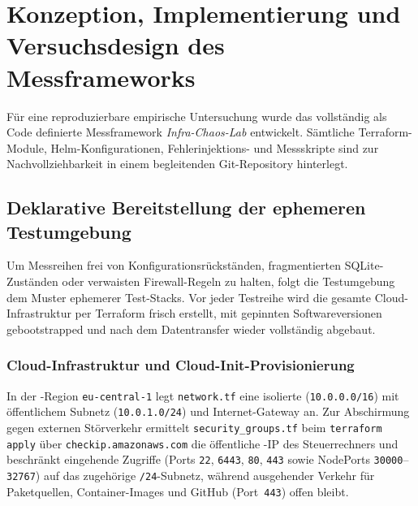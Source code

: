 \chapter{Konzeption, Implementierung und Versuchsdesign des Messframeworks}
\label{chap:konzeption-implementierung}

Für eine reproduzierbare empirische Untersuchung wurde das vollständig als Code definierte Messframework \textit{Infra-Chaos-Lab} entwickelt. Sämtliche Terraform-Module, Helm-Konfigurationen, Fehlerinjektions- und Messskripte sind zur Nachvollziehbarkeit in einem begleitenden Git-Repository hinterlegt.\autocite{messframework_repo_2026}

\section{Deklarative Bereitstellung der ephemeren Testumgebung}
\label{sec:architektur-bereitstellung-testumgebung}

Um Messreihen frei von Konfigurationsrückständen, fragmentierten SQLite-Zuständen oder verwaisten Firewall-Regeln zu halten, folgt die Testumgebung dem Muster ephemerer Test-Stacks.\autocite[Kap.~9]{morris_iac_2020} Vor jeder Testreihe wird die gesamte Cloud-Infrastruktur per Terraform frisch erstellt, mit gepinnten Softwareversionen gebootstrapped und nach dem Datentransfer wieder vollständig abgebaut.

\subsection{Cloud-Infrastruktur und Cloud-Init-Provisionierung}
\label{subsec:cloud-infrastruktur-cloud-init}

In der -Region \texttt{eu-central-1} legt \texttt{network.tf} eine isolierte  (\texttt{10.0.0.0/16}) mit öffentlichem Subnetz (\texttt{10.0.1.0/24}) und Internet-Gateway an. Zur Abschirmung gegen externen Störverkehr ermittelt \texttt{security\_groups.tf} beim \texttt{terraform apply} über \texttt{checkip.amazonaws.com} die öffentliche -IP des Steuerrechners und beschränkt eingehende Zugriffe (Ports \texttt{22}, \texttt{6443}, \texttt{80}, \texttt{443} sowie NodePorts \texttt{30000}--\texttt{32767}) auf das zugehörige \texttt{/24}-Subnetz, während ausgehender Verkehr für Paketquellen, Container-Images und GitHub (Port~\texttt{443}) offen bleibt.

